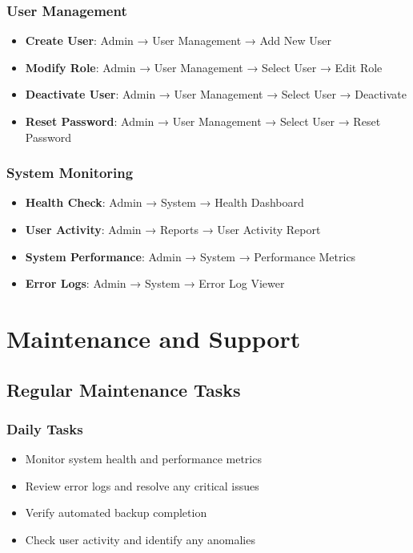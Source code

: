 \documentclass[12pt,a4paper]{article}
\begin{document}
\subsubsection{User Management}
\begin{itemize}
    \item \textbf{Create User}: Admin → User Management → Add New User
    \item \textbf{Modify Role}: Admin → User Management → Select User → Edit Role
    \item \textbf{Deactivate User}: Admin → User Management → Select User → Deactivate
    \item \textbf{Reset Password}: Admin → User Management → Select User → Reset Password
\end{itemize}

\subsubsection{System Monitoring}
\begin{itemize}
    \item \textbf{Health Check}: Admin → System → Health Dashboard
    \item \textbf{User Activity}: Admin → Reports → User Activity Report
    \item \textbf{System Performance}: Admin → System → Performance Metrics
    \item \textbf{Error Logs}: Admin → System → Error Log Viewer
\end{itemize}

\section{Maintenance and Support}

\subsection{Regular Maintenance Tasks}

\subsubsection{Daily Tasks}
\begin{itemize}
    \item Monitor system health and performance metrics
    \item Review error logs and resolve any critical issues
    \item Verify automated backup completion
    \item Check user activity and identify any anomalies
\end{itemize}
\end{document}
